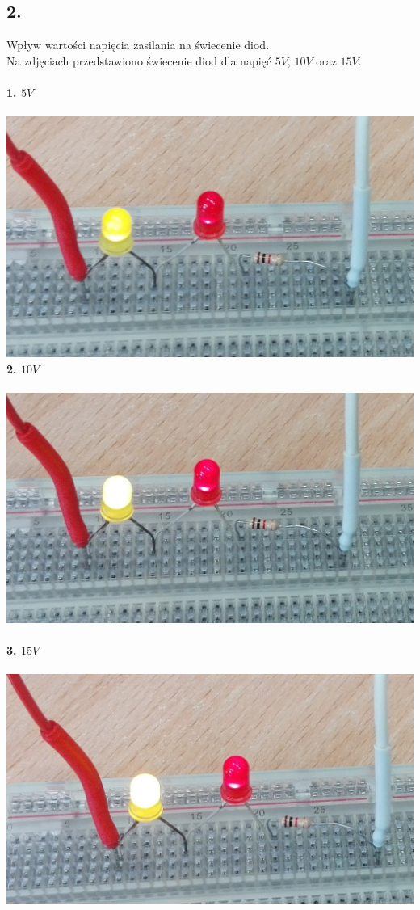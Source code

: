 \documentclass[polish,a4paper]{article}
\begin{document}
\subsection*{2.}
Wpływ wartości napięcia zasilania na świecenie diod.\\
Na zdjęciach przedstawiono świecenie diod dla napięć $5V$, $10V$ oraz $15V$.\\
\\
\textbf{1. $5V$}\\
\\
\includegraphics[width=\textwidth]{5v}
\\
\newpage
\textbf{2. $10V$}\\
\\
\includegraphics[width=\textwidth]{10v}
\\
\\
\textbf{3. $15V$}\\
\\
\includegraphics[width=\textwidth]{15V}
\\
\end{document}
